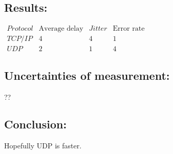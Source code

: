 \subsection*{Results:}

$\begin{array}{c|ccc}
	Protocol & \text{Average delay} & Jitter & \text{Error rate}\\
	\hline
	TCP/IP & 4 & 4 & 1 \\
	UDP & 2 & 1 & 4 
\end{array}$

\subsection*{Uncertainties of measurement:}

??

\subsection*{Conclusion:}

Hopefully UDP is faster.